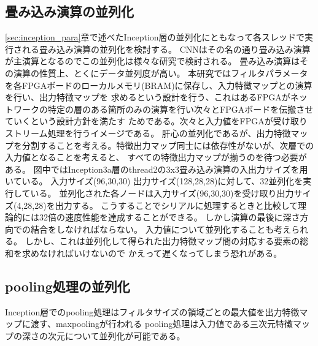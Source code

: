 {\subsection{畳み込み演算の並列化}
\label{sec:conv_para}
\ref{sec:inception_para}章で述べたInception層の並列化にともなって各スレッドで実行される畳み込み演算の並列化を検討する。
CNNはその名の通り畳み込み演算が主演算となるのでこの並列化は様々な研究で検討される。
畳み込み演算はその演算の性質上、とくにデータ並列度が高い。
本研究ではフィルタパラメータを各FPGAボードのローカルメモリ(BRAM)に保存し、入力特徴マップとの演算を行い、出力特徴マップを
求めるという設計を行う、これはあるFPGAがネットワークの特定の層のある箇所のみの演算を行い次々とFPGAボードを伝搬させていくという設計方針を満たす
ためである。次々と入力値をFPGAが受け取りストリーム処理を行うイメージである。
肝心の並列化であるが、出力特徴マップを分割することを考える。特徴出力マップ同士には依存性がないが、次層での入力値となることを考えると、
すべての特徴出力マップが揃うのを待つ必要がある。
図中ではInception3a層のthread2の3x3畳み込み演算の入出力サイズを用いている。
入力サイズ(96,30,30) 出力サイズ(128,28,28)に対して、32並列化を実行している。
並列化された各ノードは入力サイズ(96,30,30)を受け取り出力サイズ(4,28,28)を出力する。
こうすることでシリアルに処理するときと比較して理論的には32倍の速度性能を達成することができる。
しかし演算の最後に深さ方向での結合をしなければならない。
入力値について並列化することも考えられる。
しかし、これは並列化して得られた出力特徴マップ間の対応する要素の総和を求めなければいけないので
かえって遅くなってしまう恐れがある。

\subsection{pooling処理の並列化}
\label{sec:pool_para}
Inception層でのpooling処理はフィルタサイズの領域ごとの最大値を出力特徴マップに渡す、maxpoolingが行われる
pooling処理は入力値である三次元特徴マップの深さの次元について並列化が可能である。

}